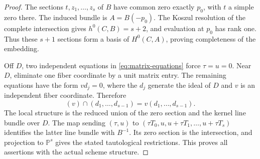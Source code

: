 \documentclass[11pt,reqno]{amsart}
\numberwithin{equation}{section}
\theoremstyle{definition}
\theoremstyle{remark}
\newcommand{\PP}{\mathbb P}
\begin{document}
\begin{proof}
The sections $t,z_1,\ldots,z_s$ of $B$ have common zero exactly $p_0$, with $t$ a simple zero there. The induced bundle is $A=B(-p_0)$. The Koszul resolution of the complete intersection gives $h^0(C,B)=s+2$, and evaluation at $p_0$ has rank one. Thus these $s+1$ sections form a basis of $H^0(C,A)$, proving completeness of the embedding.

Off $D$, two independent equations in \eqref{eq:matrix-equations} force $\tau=u=0$. Near $D$, eliminate one fiber coordinate by a unit matrix entry. The remaining equations have the form $v d_j=0$, where the $d_j$ generate the ideal of $D$ and $v$ is an independent fiber coordinate. Therefore
\[
 (v)\cap(d_1,\ldots,d_{s-1})=v(d_1,\ldots,d_{s-1}).
\]
The local structure is the reduced union of the zero section and the kernel line bundle over $D$. The map sending $(\tau,u)$ to $(\tau T_0,u,u+\tau T_1,\ldots,u+\tau T_s)$ identifies the latter line bundle with $B^{-1}$. Its zero section is the intersection, and projection to $\PP^s$ gives the stated tautological restrictions. This proves all assertions with the actual scheme structure.
\end{proof}
\end{document}
